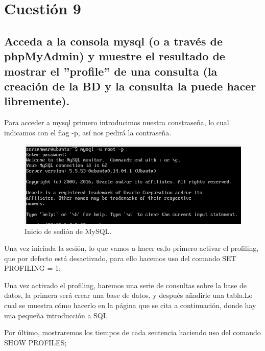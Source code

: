 \section{Cuestión 9}

\subsection{\Large Acceda a la consola mysql (o a través de phpMyAdmin) y muestre el resultado de mostrar el ”profile” de una consulta (la creación de la BD y la consulta la puede hacer libremente).}

Para acceder a mysql primero introducimos nuestra constraseña, lo cual indicamos con el flag -p, así nos pedirá la contraseña.

\begin{figure}[H] %
	\centering
	\includegraphics[scale=0.5]{imagenes/creacion-mysql.png}  %
	\caption{Inicio de sedión de MySQL.}
\end{figure}

Una vez iniciada la sesión, lo que vamos a hacer es,lo primero activar el profiling, que por defecto está desactivado, para ello hacemos uso del comando SET PROFILING = 1;
\cite{mysql}

Una vez activado el profiling, haremos una serie de consultas sobre la base de datos, la primera será crear una base de datos, y después añadirle una tabla.Lo cual se muestra cómo hacerlo en la página que se cita a continuación, donde hay una pequeña introducción a SQL \cite{mysql-crea}

Por último, mostraremos los tiempos de cada sentencia haciendo uso del comando SHOW PROFILES; \cite{mysql2}


